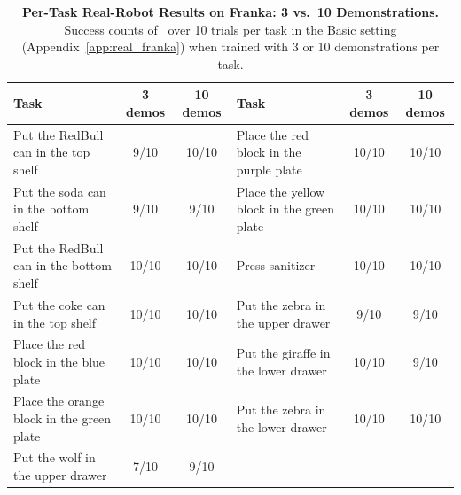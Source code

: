 \begin{table}[!t]
\centering
\caption{\textbf{Per-Task Real-Robot Results on Franka: 3 vs.\ 10 Demonstrations.}
Success counts of \method\ over 10 trials per task in the Basic
setting (Appendix~\ref{app:real_franka}) when trained with 3 or 10
demonstrations per task.}
\label{tab:app:real_episode}
\footnotesize
\setlength{\tabcolsep}{3pt}
\setlength{\aboverulesep}{0pt}
\setlength{\belowrulesep}{0pt}
\renewcommand{\arraystretch}{1.05}
\begin{tabular}{lcc@{\hspace{3em}}lcc}
\toprule
\textbf{Task} & \textbf{3 demos} & \textbf{10 demos}
& \textbf{Task} & \textbf{3 demos} & \textbf{10 demos} \\
\midrule
Put the RedBull can in the top shelf        & 9/10  & 10/10
& Place the red block in the purple plate    & 10/10 & 10/10 \\
Put the soda can in the bottom shelf        & 9/10  & 9/10
& Place the yellow block in the green plate  & 10/10 & 10/10 \\
Put the RedBull can in the bottom shelf     & 10/10 & 10/10
& Press sanitizer                            & 10/10 & 10/10 \\
Put the coke can in the top shelf           & 10/10 & 10/10
& Put the zebra in the upper drawer          & 9/10  & 9/10 \\
Place the red block in the blue plate       & 10/10 & 10/10
& Put the giraffe in the lower drawer        & 10/10 & 9/10 \\
Place the orange block in the green plate   & 10/10 & 10/10
& Put the zebra in the lower drawer          & 10/10 & 10/10 \\
Put the wolf in the upper drawer            & 7/10  & 9/10
&                                            &       &       \\
\bottomrule
\end{tabular}
\end{table}
